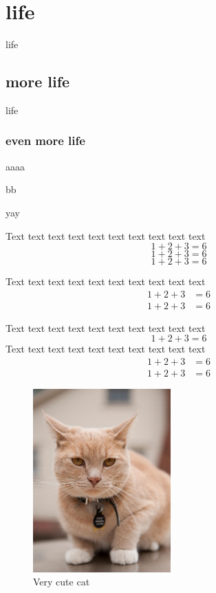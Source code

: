 \documentclass{iyte}    %
\begin{document}
\section{life}
life

\subsection{more life}
life

\subsubsection{even more life}
aaaa

bb

yay

Text text text text text text text text text text
\begin{equation}
1 + 2 + 3 = 6
\end{equation}  
\begin{equation}
1 + 2 + 3 = 6
\end{equation} 
\begin{equation}
1 + 2 + 3 = 6
\end{equation} 

Text text text text text text text text text text
\begin{align}
1 + 2 + 3 &= 6 \\
1 + 2 + 3 &= 6
\end{align}



Text text text text text text text text text text
\begin{equation}
1 + 2 + 3 = 6
\end{equation}  
Text text text text text text text text text text
\begin{align}
1 + 2 + 3 &= 6 \\
1 + 2 + 3 &= 6
\end{align}

\begin{figure}[h]
	\caption{Very cute cat}
	\includegraphics[width=200px]{cat}
	\centering
\end{figure}
\end{document}
